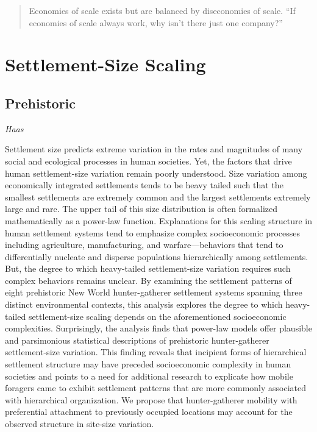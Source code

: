 \documentclass[
]{book}
\begin{document}
\begin{quote}
Economies of scale exists but are balanced by diseconomies of scale. ``If economies of scale always work, why isn't there just one company?'' \citeyearpar{nntaleb}
\end{quote}

\hypertarget{settlement-size-scaling}{%
\section{Settlement-Size Scaling}\label{settlement-size-scaling}}

\hypertarget{prehistoric}{%
\subsection{Prehistoric}\label{prehistoric}}

\emph{Haas}

Settlement size predicts extreme variation in the rates and magnitudes of many social and ecological processes in human societies. Yet, the factors that drive human settlement-size variation remain poorly understood. Size variation among economically integrated settlements tends to be heavy tailed such that the smallest settlements are extremely common and the largest settlements extremely large and rare. The upper tail of this size distribution is often formalized mathematically as a power-law function. Explanations for this scaling structure in human settlement systems tend to emphasize complex socioeconomic processes including agriculture, manufacturing, and warfare---behaviors that tend to differentially nucleate and disperse populations hierarchically among settlements. But, the degree to which heavy-tailed settlement-size variation requires such complex behaviors remains unclear. By examining the settlement patterns of eight prehistoric New World hunter-gatherer settlement systems spanning three distinct environmental contexts, this analysis explores the degree to which heavy-tailed settlement-size scaling depends on the aforementioned socioeconomic complexities. Surprisingly, the analysis finds that power-law models offer plausible and parsimonious statistical descriptions of prehistoric hunter-gatherer settlement-size variation. This finding reveals that incipient forms of hierarchical settlement structure may have preceded socioeconomic complexity in human societies and points to a need for additional research to explicate how mobile foragers came to exhibit settlement patterns that are more commonly associated with hierarchical organization. We propose that hunter-gatherer mobility with preferential attachment to previously occupied locations may account for the observed structure in site-size variation.
\end{document}
